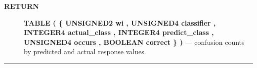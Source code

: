 \par
\begin{description}
\item [\colorbox{tagtype}{\color{white} \textbf{\textsf{RETURN}}}] \textbf{TABLE ( \{ UNSIGNED2 wi , UNSIGNED4 classifier , INTEGER4 actual\_class , INTEGER4 predict\_class , UNSIGNED4 occurs , BOOLEAN correct \} )} --- confusion counts by predicted and actual response values.
\end{description}




\rule{\linewidth}{0.5pt}
